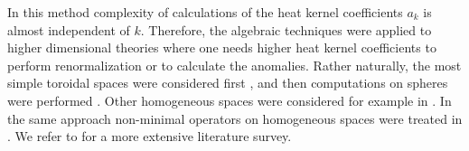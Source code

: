 In this method complexity of calculations of the heat kernel
coefficients $a_k$ is almost independent of $k$. Therefore,
the algebraic techniques were applied to higher dimensional theories
where one needs higher heat kernel coefficients to
perform renormalization or to calculate the anomalies.
Rather naturally, the most simple toroidal spaces were
considered first \cite{Appelquist:1983zs,Appelquist:1983vs,Rubin:1983zz,
Kogan:1983fp,Fradkin:1983kf,Buchbinder:1988np}, and then
computations on spheres were performed
\cite{Candelas:1984ae,Kikkawa:1985qc,Kantowski:1987ct,Birmingham:1987cy,
Birmingham:1988iv,Gleiser:1987mg,BuchOd,Buchbinder:1989cd,Elizalde:1996nb}.
Other homogeneous spaces were considered for example in 
\cite{Lyakhovsky:1991vv,Vassilevich:1991zi}. In the same approach
non-minimal operators on homogeneous spaces were treated
in \cite{Vassilevich:1992tb,Vassilevich:1993yt}. We refer to
\cite{Camporesi:1990wm} for a more extensive literature survey.
